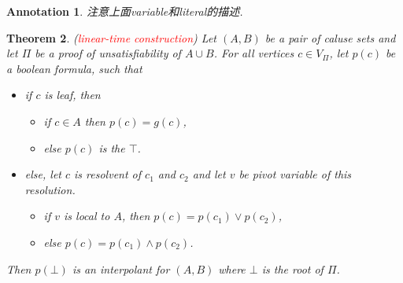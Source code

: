 \documentclass{article}
\newtheorem{theorem}{Theorem}[section]
\newtheorem{annotation}[theorem]{Annotation}
\newcommand{\redt}[1]{\textcolor{red}{#1}}
\begin{document}
\begin{annotation}
\rm 注意上面variable和literal的描述. 
\end{annotation}

\begin{theorem}
\rm (\redt{linear-time construction}) Let $(A,B)$ be a pair of caluse sets and let $\varPi$ be a proof of unsatisfiability of $A \cup B$. For all vertices $c \in V_{\varPi}$, let $p(c)$ be a boolean formula, such that 
\begin{itemize}
	\item if $c$ is leaf, then
	\begin{itemize}
		\item if $c \in A$ then $p(c) = g(c)$,
		\item else $p(c)$ is the $\top$.
	\end{itemize}
	\item else, let $c$ is resolvent of $c_1$ and $c_2$ and let $v$ be pivot variable of this resolution. 
	\begin{itemize}
		\item if $v$ is local to $A$, then $p(c) = p(c_1) \vee p(c_2)$,
		\item else $p(c) = p(c_1) \wedge p(c_2)$.
	\end{itemize}
\end{itemize}
Then $p(\bot)$ is an interpolant for $(A, B)$ where $\bot$ is the root of $\varPi$.
\end{theorem}


\makeatletter
\DeclareRobustCommand{\lvdots}{%
  \vbox{
    \baselineskip6\p@\lineskiplimit\z@
    \kern-\p@
    \hbox{.}\hbox{.}\hbox{.}\hbox{.}\hbox{.}\hbox{.}\hbox{.}\hbox{.}\hbox{.}
  }}
\makeatother
\end{document}
